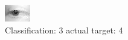 \begin{figure}[h!]
\begin{center}
\includegraphics[width=0.60\columnwidth]{figures/ID2644_class_3_target_4.png}
\end{center}
\caption{ Classification: 3 actual target: 4}
\label{fig:ID2644_class_3_target_4}
\end{figure}
